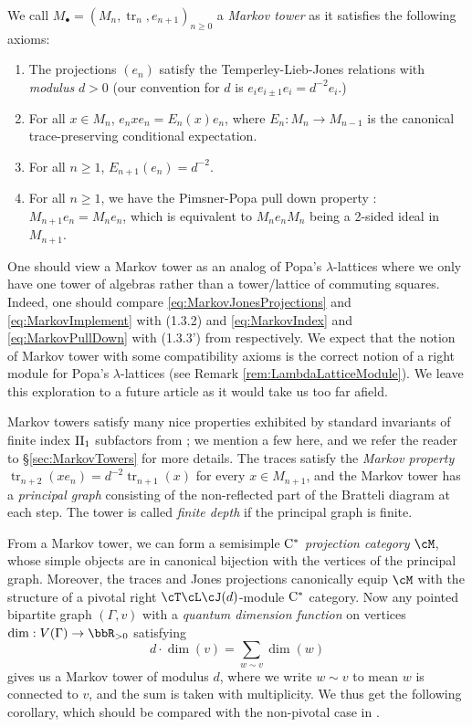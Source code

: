 \documentclass[11pt]{article}
\theoremstyle{plain}
\theoremstyle{definition}
\DeclareMathOperator{\tr}{tr}
\newcommand{\Cstar}{\rm{C^*}}
\begin{document}
We call $M_\bullet = (M_n, \tr_n, e_{n+1})_{n\geq 0}$ 
a \emph{Markov tower} as it satisfies the following axioms:
\begin{enumerate}[label={\rm(M\arabic*)}]
\item
The projections $(e_n)$ satisfy the Temperley-Lieb-Jones relations with \emph{modulus} $d>0$ (our convention for $d$ is $e_ie_{i\pm 1}e_i = d^{-2} e_i$.)
\item
For all $x\in M_n$, $e_n xe_n = E_n(x) e_n$, where $E_n: M_n \to M_{n-1}$ is the canonical trace-preserving conditional expectation.
\item
For all $n\geq 1$, $E_{n+1}(e_n) = d^{-2}$.
\item
For all $n\geq 1$, we have the Pimsner-Popa pull down property \cite{MR860811}: $M_{n+1} e_n = M_n e_n$, which is equivalent to $M_n e_n M_n$ being a 2-sided ideal in $M_{n+1}$.
\end{enumerate}
One should view a Markov tower as an analog of Popa's $\lambda$-lattices \cite{MR1334479} where we only have one tower of algebras rather than a tower/lattice of commuting squares.
Indeed, one should compare \ref{eq:MarkovJonesProjections} and \ref{eq:MarkovImplement} with (1.3.2) and \ref{eq:MarkovIndex} and \ref{eq:MarkovPullDown} with (1.3.3') from \cite{MR1334479} respectively.
We expect that the notion of Markov tower with some compatibility axioms is the correct notion of a right module for Popa's $\lambda$-lattices (see Remark \ref{rem:LambdaLatticeModule}).
We leave this exploration to a future article as it would take us too far afield.

Markov towers satisfy many nice properties exhibited by standard invariants of finite index ${\rm II}_1$ subfactors from \cite[Ch.~4]{MR999799}; we mention a few here, and we refer the reader to \S\ref{sec:MarkovTowers} for more details.
The traces satisfy the \emph{Markov property} $\tr_{n+2}(x e_n) = d^{-2}\tr_{n+1}(x)$ for every $x\in M_{n+1}$, and the Markov tower has a \emph{principal graph} consisting of the non-reflected part of the Bratteli diagram at each step.
The tower is called \emph{finite depth} if the principal graph is finite.

From a Markov tower, we can form a semisimple $\Cstar$ \emph{projection category} $\cM$, whose simple objects are in canonical bijection with the vertices of the principal graph.
Moreover, the traces and Jones projections canonically equip $\cM$ with the structure of a pivotal right $\cT\cL\cJ(d)$-module $\Cstar$ category.
Now any pointed bipartite graph $(\Gamma,v)$ with a \emph{quantum dimension function} on vertices $\dim: V(\Gamma) \to \bbR_{>0}$ satisfying
$$
d\cdot \dim(v) = \sum_{w\sim v} \dim(w)
$$
gives us a Markov tower of modulus $d$, where we write $w\sim v$ to mean $w$ is connected to $v$, and the sum is taken with multiplicity.
We thus get the following corollary, which should be compared with the non-pivotal case in \cite{MR3420332}.
\end{document}
